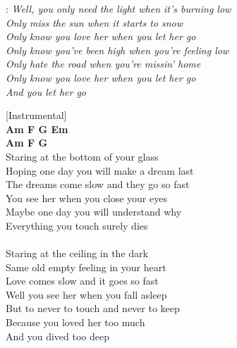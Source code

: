
\textregistered:
\emph{
Well, you only need the light when it's burning low\\
Only miss the sun when it starts to snow\\
Only know you love her when you let her go\\
Only know you've been high when you're feeling low\\
Only hate the road when you're missin' home\\
Only know you love her when you let her go\\
And you let her go\\
}

[Instrumental]\\
\textbf{Am F G Em}\\
\textbf{Am F G}\\

Staring at the bottom of your glass\\
Hoping one day you will make a dream last\\
The dreams come slow and they go so fast\\
You see her when you close your eyes\\
Maybe one day you will understand why\\
Everything you touch surely dies\\

\textregistered\\

Staring at the ceiling in the dark\\
Same old empty feeling in your heart\\
Love comes slow and it goes so fast\\
Well you see her when you fall asleep\\
But to never to touch and never to keep\\
Because you loved her too much\\
And you dived too deep\\

\textregistered
\textregistered\\

\newpage
